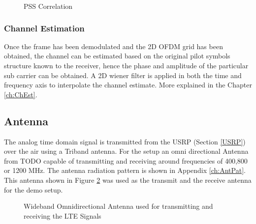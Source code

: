 \begin{figure}[H]
    \begin{center}
        \caption{PSS Correlation}
        \label{fig:PSSCorr}
    \end{center}
\end{figure}

\subsubsection{Channel Estimation}

Once the frame has been demodulated and the 2D OFDM grid has been obtained, the channel can be estimated based on the original pilot symbols structure known to the receiver, hence the phase and amplitude of the particular sub carrier can be obtained. A 2D wiener filter is applied in both the time and frequency axis to interpolate the channel estimate. More explained in the Chapter \ref{ch:ChEst}.


\subsection{Antenna}
The analog time domain signal is transmitted from the USRP (Section \ref{USRP}) over the air using a Triband antenna. For the setup an omni directional Antenna from TODO capable of transmitting and receiving around frequencies of 400,800 or 1200 MHz. The antenna radiation pattern is shown in Appendix \ref{ch:AntPat}. This antenna shown in Figure \ref{fig:USRPAnt} was used as the transmit and the receive antenna for the demo setup.

\begin{figure}[H]
    \begin{center}
        \caption{Wideband Omnidirectional Antenna used for transmitting and receiving the LTE Signals}
        \label{fig:USRPAnt}
    \end{center}
\end{figure}
